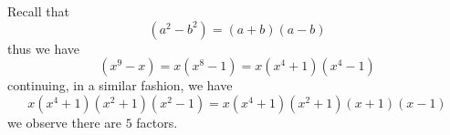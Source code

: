 \documentclass[11pt]{article}
\begin{document}
Recall that 
\[
    \left( a^2  - b^2  \right) = \left( a + b \right) \left( a - b \right) 
\]
thus we have 
\[
    \left( x^{9}  - x \right) = x\left( x^{8} -1 \right) = x\left( x^{4}  + 1 \right) \left( x^{4}  - 1 \right) 
\]
continuing, in a similar fashion, we have 
\[
    x\left( x^{4}  + 1 \right) \left( x^{2}  + 1 \right) \left( x^{2}  - 1 \right) =  x\left( x^{4}  + 1 \right) \left( x^{2}  + 1 \right) \left( x  + 1 \right) \left( x - 1 \right) 
\]
we observe there are \(\boxed{5}\) factors.
\end{document}
